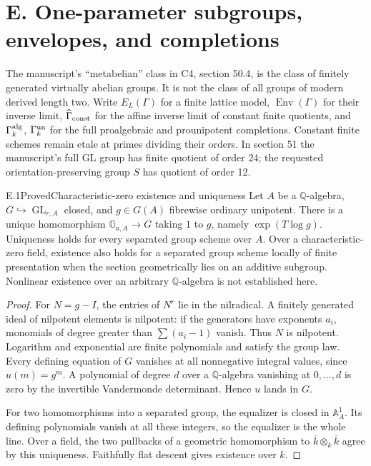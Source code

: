 \section{E. One-parameter subgroups, envelopes, and completions}

The manuscript's ``metabelian'' class in C4, section 50.4,
is the class of finitely generated virtually abelian groups.
It is not the class of all groups of modern derived length two.
Write $E_L(\Gamma)$ for a finite lattice model,
$\operatorname{Env}(\Gamma)$ for their inverse limit,
$\widehat\Gamma_{\rm const}$ for the affine inverse limit
of constant finite quotients, and $\Gamma_k^{\rm alg}$,
$\Gamma_k^{\rm un}$ for the full proalgebraic and prounipotent
completions. Constant finite schemes remain etale at primes
dividing their orders. In section 51 the manuscript's full
GL group has finite quotient of order 24; the requested
orientation-preserving group $S$ has quotient of order 12.

\begin{statement}{E.1}{Proved}{Characteristic-zero existence and uniqueness}
Let $A$ be a $\mathbb Q$-algebra, $G\hookrightarrow\operatorname{GL}_{r,A}$
closed, and $g\in G(A)$ fibrewise ordinary unipotent.
There is a unique homomorphism $\mathbb G_{a,A}\to G$
taking $1$ to $g$, namely $\exp(T\log g)$.
Uniqueness holds for every separated group scheme over $A$.
Over a characteristic-zero field, existence also holds for
a separated group scheme locally of finite presentation
when the section geometrically lies on an additive subgroup.
Nonlinear existence over an arbitrary $\mathbb Q$-algebra
is not established here.
\end{statement}
\begin{proof}
For $N=g-I$, the entries of $N^r$ lie in the nilradical.
A finitely generated ideal of nilpotent elements is nilpotent:
if the generators have exponents $a_i$, monomials of degree
greater than $\sum(a_i-1)$ vanish. Thus $N$ is nilpotent.
Logarithm and exponential are finite polynomials and satisfy
the group law. Every defining equation of $G$ vanishes at
all nonnegative integral values, since $u(m)=g^m$.
A polynomial of degree $d$ over a $\mathbb Q$-algebra
vanishing at $0,\ldots,d$ is zero by the invertible
Vandermonde determinant. Hence $u$ lands in $G$.

For two homomorphisms into a separated group, the equalizer
is closed in $\mathbb A^1_A$. Its defining polynomials vanish
at all these integers, so the equalizer is the whole line.
Over a field, the two pullbacks of a geometric homomorphism
to $\overline k\otimes_k\overline k$ agree by this uniqueness.
Faithfully flat descent gives existence over $k$.
\end{proof}

